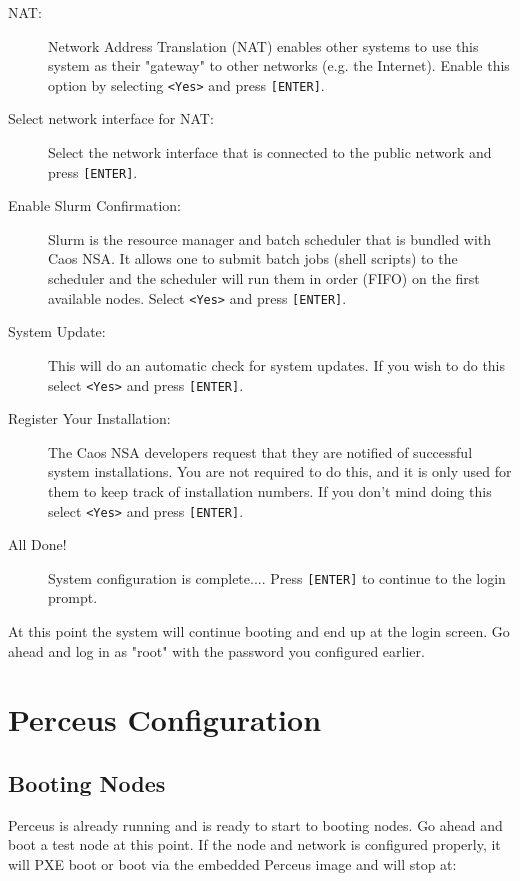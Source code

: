 \documentclass[10pt,letterpaper]{article}
\begin{document}
\begin{description}
\item[NAT:] Network Address Translation (NAT) enables other systems to
use this system as their "gateway" to other networks (e.g. the Internet).
Enable this option by selecting {\tt <Yes>} and press {\tt [ENTER]}.

\item[Select network interface for NAT:] Select the network interface
that is connected to the public network and press {\tt [ENTER]}.

\item[Enable Slurm Confirmation:] Slurm is the resource manager and batch
scheduler that is bundled with Caos NSA. It allows one to submit batch jobs
(shell scripts) to the scheduler and the scheduler will run them in order
(FIFO) on the first available nodes. Select {\tt <Yes>} and press
{\tt [ENTER]}.

\item[System Update:] This will do an automatic check for system
updates. If you wish to do this select {\tt <Yes>} and press {\tt [ENTER]}.

\item[Register Your Installation:] The Caos NSA developers request
that they are notified of successful system installations. You are not
required to do this, and it is only used for them to keep track of
installation numbers. If you don't mind doing this select {\tt <Yes>} and
press {\tt [ENTER]}.

\item[All Done!] System configuration is complete.... Press
{\tt [ENTER]} to continue to the login prompt.

\end{description}

At this point the system will continue booting and end up at the login
screen. Go ahead and log in as "root" with the password you configured
earlier.

\section{Perceus Configuration}

\subsection{Booting Nodes}
Perceus is already running and is ready to start to booting nodes. Go ahead
and boot a test node at this point. If the node and network is configured
properly, it will PXE boot or boot via the embedded Perceus image and will
stop at:
\end{document}
